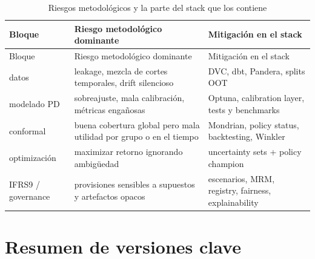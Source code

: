 \documentclass[
  spanish,
  11pt,
  letterpaper,
]{scrbook}
\theoremstyle{plain}
\theoremstyle{remark}
\begin{document}
\begin{longtable}[]{@{}
  >{\raggedright\arraybackslash}p{}
  >{\raggedright\arraybackslash}p{}
  >{\raggedright\arraybackslash}p{}@{}}
\caption{Riesgos metodológicos y la parte del stack que los
contiene}\label{tbl-stack-risk-checklist}\tabularnewline
\toprule\noalign{}
\begin{minipage}[b]{\linewidth}\raggedright
Bloque
\end{minipage} & \begin{minipage}[b]{\linewidth}\raggedright
Riesgo metodológico dominante
\end{minipage} & \begin{minipage}[b]{\linewidth}\raggedright
Mitigación en el stack
\end{minipage} \\
\midrule\noalign{}
\endfirsthead
\toprule\noalign{}
\begin{minipage}[b]{\linewidth}\raggedright
Bloque
\end{minipage} & \begin{minipage}[b]{\linewidth}\raggedright
Riesgo metodológico dominante
\end{minipage} & \begin{minipage}[b]{\linewidth}\raggedright
Mitigación en el stack
\end{minipage} \\
\midrule\noalign{}
\endhead
\bottomrule\noalign{}
\endlastfoot
datos & leakage, mezcla de cortes temporales, drift silencioso & DVC,
dbt, Pandera, splits OOT \\
modelado PD & sobreajuste, mala calibración, métricas engañosas &
Optuna, calibration layer, tests y benchmarks \\
conformal & buena cobertura global pero mala utilidad por grupo o en el
tiempo & Mondrian, policy status, backtesting, Winkler \\
optimización & maximizar retorno ignorando ambigüedad & uncertainty sets
+ policy champion \\
IFRS9 / governance & provisiones sensibles a supuestos y artefactos
opacos & escenarios, MRM, registry, fairness, explainability \\
\end{longtable}

\section{Resumen de versiones clave}\label{resumen-de-versiones-clave}
\end{document}
